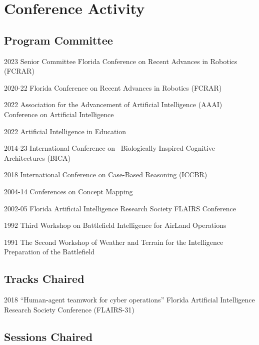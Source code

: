 \documentclass[12pt,letterpaper]{report}
\begin{document}
\newpage
    \section*{Conference Activity}

    \subsection*{Program Committee}
    \begin{tablist}
        \item[2023] \tab{}Senior Committee Florida Conference on Recent Advances in Robotics (FCRAR)
        \item[2020-22] \tab{}Florida Conference on Recent Advances in Robotics (FCRAR)
        \item[2022] \tab{}Association for the Advancement of Artificial Intelligence (AAAI) Conference on Artificial Intelligence
        \item[2022] \tab{}Artificial Intelligence in Education
        \item[2014-23] \tab{}International Conference on  Biologically Inspired Cognitive Architectures (BICA)
        \item[2018] \tab{}International Conference on Case-Based Reasoning (ICCBR)
        \item[2004-14] \tab{}Conferences on Concept Mapping 
        \item[2002-05] \tab{}Florida Artificial Intelligence Research Society FLAIRS Conference
        \item[1992] \tab{}Third Workshop on Battlefield Intelligence for AirLand Operations
        \item[1991] \tab{}The Second Workshop of Weather and Terrain for the Intelligence Preparation of the Battlefield
    \end{tablist}

    \subsection*{Tracks Chaired}
    \begin{tablist}
        \item[2018] \tab{}\enquote{Human-agent teamwork for cyber operations} Florida Artificial Intelligence Research Society Conference (FLAIRS-31)
    \end{tablist}

    \subsection*{Sessions Chaired}
\end{document}
